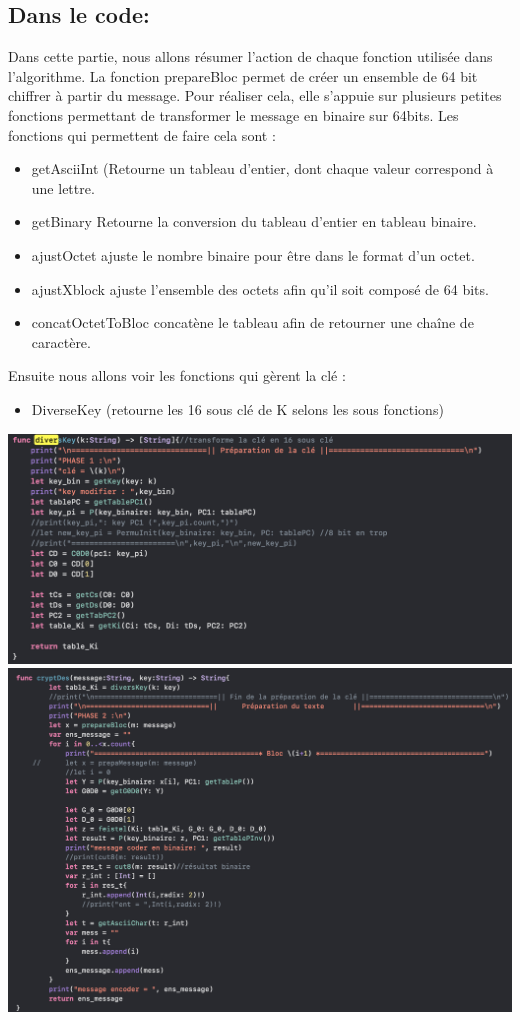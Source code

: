 \documentclass{article}
\begin{document}
\subsection{Dans le code:}
Dans cette partie, nous allons résumer l'action de chaque fonction utilisée dans l'algorithme.
La fonction prepareBloc permet de créer un ensemble de 64 bit chiffrer à partir du message.
Pour réaliser cela, elle s'appuie sur plusieurs petites fonctions permettant de transformer le message en binaire sur 64bits.\newline 
Les fonctions qui permettent de faire cela sont :
\begin{itemize}
    \item getAsciiInt (Retourne un tableau d'entier, dont chaque valeur correspond à une lettre.
\item getBinary Retourne la conversion du tableau d'entier en tableau binaire.
\item ajustOctet ajuste le nombre binaire pour être dans le format d'un octet.
\item ajustXblock ajuste l'ensemble des octets afin qu'il soit composé de 64 bits.
\item concatOctetToBloc concatène le tableau afin de retourner une chaîne de caractère.
\end{itemize}
Ensuite nous allons voir les fonctions qui gèrent la clé :
\begin{itemize}
    \item DiverseKey (retourne les 16 sous clé de K selons les sous fonctions)
\end{itemize}
\begin{center}
    \includegraphics[scale=0.25]{DESKEY.png}
    \includegraphics[scale=0.25]{DESCRYPT.png}
\end{center}
\newpage
\end{document}
